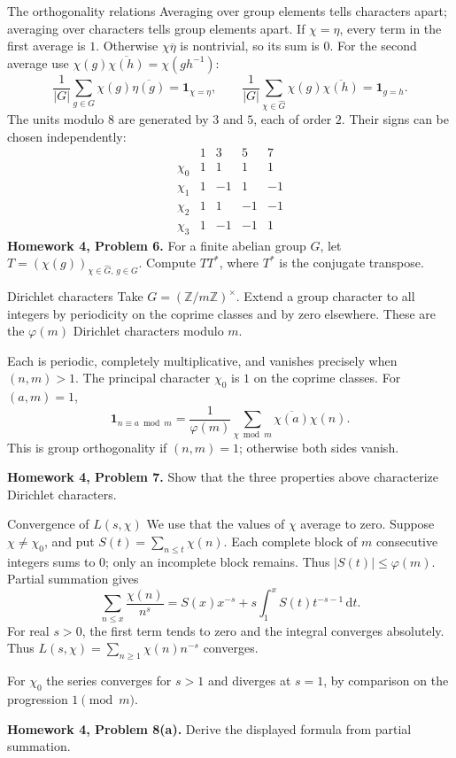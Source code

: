 \documentclass[aspectratio=169,11pt]{beamer}
\newcommand{\Z}{\mathbb Z}
\newcommand{\ind}{\mathbf1}
\newcommand{\dd}{\,\mathrm d}
\newcommand{\HW}[2]{{\color{teal}\textbf{Homework #1, Problem #2.}}}
\begin{document}
\begin{frame}{The orthogonality relations}
\small
Averaging over group elements tells characters apart; averaging over characters tells group elements apart. If $\chi=\eta$, every term in the first average is $1$. Otherwise $\chi\overline\eta$ is nontrivial, so its sum is $0$. For the second average use $\chi(g)\overline{\chi(h)}=\chi(gh^{-1})$:
\[\frac1{|G|}\sum_{g\in G}\chi(g)\overline{\eta(g)}=\ind_{\chi=\eta},\qquad
\frac1{|G|}\sum_{\chi\in\widehat G}\chi(g)\overline{\chi(h)}=\ind_{g=h}.\]
The units modulo $8$ are generated by $3$ and $5$, each of order $2$. Their signs can be chosen independently:
\[\begin{array}{c|rrrr}&1&3&5&7\\\hline\chi_0&1&1&1&1\\\chi_1&1&-1&1&-1\\\chi_2&1&1&-1&-1\\\chi_3&1&-1&-1&1\end{array}\]
\HW{4}{6} For a finite abelian group $G$, let $T=(\chi(g))_{\chi\in\widehat G,\,g\in G}$. Compute $TT^*$, where $T^*$ is the conjugate transpose.
\end{frame}
\begin{frame}{Dirichlet characters}
Take $G=(\Z/m\Z)^\times$. Extend a group character to all integers by periodicity on the coprime classes and by zero elsewhere. These are the $\varphi(m)$ Dirichlet characters modulo $m$.

Each is periodic, completely multiplicative, and vanishes precisely when $(n,m)>1$. The principal character $\chi_0$ is $1$ on the coprime classes. For $(a,m)=1$,
\[\ind_{n\equiv a\bmod m}=\frac1{\varphi(m)}\sum_{\chi\bmod m}\overline{\chi(a)}\chi(n).\]
This is group orthogonality if $(n,m)=1$; otherwise both sides vanish.

\HW{4}{7} Show that the three properties above characterize Dirichlet characters.
\end{frame}
\begin{frame}{Convergence of $L(s,\chi)$}
We use that the values of $\chi$ average to zero. Suppose $\chi\ne\chi_0$, and put $S(t)=\sum_{n\le t}\chi(n)$. Each complete block of $m$ consecutive integers sums to $0$; only an incomplete block remains. Thus $|S(t)|\le\varphi(m)$. Partial summation gives
\[\sum_{n\le x}\frac{\chi(n)}{n^s}=S(x)x^{-s}+s\int_1^x S(t)t^{-s-1}\dd t.\]
For real $s>0$, the first term tends to zero and the integral converges absolutely. Thus $L(s,\chi)=\sum_{n\ge1}\chi(n)n^{-s}$ converges.

For $\chi_0$ the series converges for $s>1$ and diverges at $s=1$, by comparison on the progression $1\pmod m$.

\HW{4}{8(a)} Derive the displayed formula from partial summation.
\end{frame}
\end{document}
